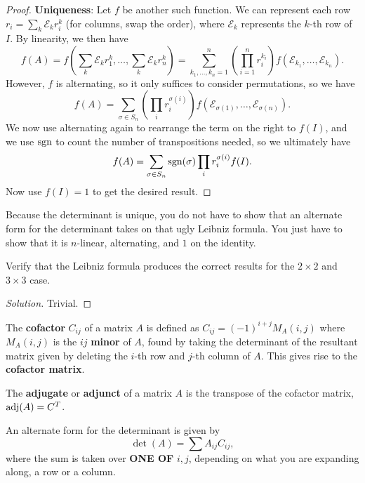 \begin{proof}
\textbf{Uniqueness}: Let $f$ be another such function. We can represent
each row $r_i = \sum_k \mathcal{E}_k r_i^k$ (for columns, swap the
order), where $\mathcal{E}_k$ represents the $k$-th row of $I$. By
linearity, we then have
\[ f(A) = f\left(\sum_k \mathcal{E}_k r_1^k, \dots, \sum_k \mathcal{E}_k
r_n^k\right) = \sum_{k_1, \dots, k_n = 1}^n \left(\prod_{i = 1}^n
r_i^{k_i}\right) f(\mathcal{E}_{k_1}, \dots, \mathcal{E}_{k_n}). \]
However, $f$ is alternating, so it only suffices to consider
permutations, so we have
\[ f(A) = \sum_{\sigma \in S_n} \left(\prod_i r_i^{\sigma(i)}\right)
f(\mathcal{E}_{\sigma(1)}, \dots, \mathcal{E}_{\sigma(n)}). \]
We now use alternating again to rearrange the term on the right to
$f(I)$, and we use $\operatorname{sgn}$ to count the number of transpositions needed,
so we ultimately have
\[ f(A) = \sum_{\sigma \in S_n} \operatorname{sgn}(\sigma) \prod_i r_i^{\sigma(i)}
f(I). \]
Now use $f(I) = 1$ to get the desired result.
\end{proof}

\begin{rem}
Because the determinant is unique, you do not have to show that an
alternate form for the determinant takes on that ugly Leibniz formula.
You just have to show that it is $n$-linear, alternating, and $1$ on the
identity.
\end{rem}

\begin{prb}
Verify that the Leibniz formula produces the correct results for the $2
\times 2$ and $3 \times 3$ case.
\end{prb}

\begin{proof}[Solution]
Trivial.
\end{proof}

\begin{df}
The \textbf{cofactor} $C_{ij}$ of a matrix $A$ is defined as $C_{ij} =
(-1)^{i + j} M_A(i, j)$ where $M_A(i, j)$ is the $ij$ \textbf{minor} of
$A$, found by taking the determinant of the resultant matrix given by
deleting the $i$-th row and $j$-th column of $A$. This gives rise to the
\textbf{cofactor matrix}.
\end{df}

\begin{df}
The \textbf{adjugate} or \textbf{adjunct} of a matrix $A$ is the
transpose of the cofactor matrix, $\operatorname{adj}(A) = C^T$.
\end{df}

\begin{thm}
An alternate form for the determinant is given by
\[ \det(A) = \sum A_{ij} C_{ij}, \]
where the sum is taken over \textbf{ONE OF} $i, j$, depending on what
you are expanding along, a row or a column.
\end{thm}

